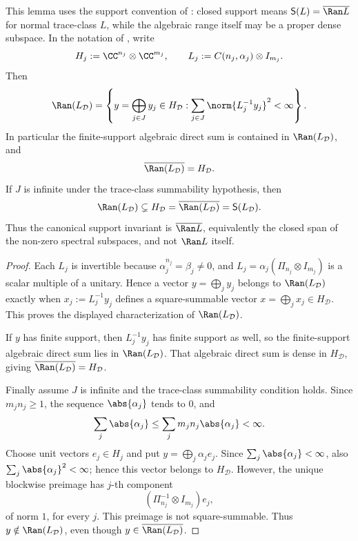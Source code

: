 \begin{lemma}
  \label{lem:cyclic-sum-range-closure}
  This lemma uses the support convention of
  : closed support means
  \(\mathsf S(L)=\overline{\Ran L}\) for normal trace-class \(L\), while
  the algebraic range itself may be a proper dense subspace.
  In the notation of , write
  \[
    H_j:=\CC^{n_j}\otimes\CC^{m_j},
    \qquad
    L_j:=C(n_j,\alpha_j)\otimes I_{m_j}.
  \]
  Then
  \[
    \Ran(L_{\mathcal D})
    =
    \left\{
      y=\bigoplus_{j\in J}y_j\in H_{\mathcal D}:
      \sum_{j\in J}\norm{L_j^{-1}y_j}^{2}<\infty
    \right\}.
  \]
  In particular the finite-support algebraic direct sum is contained in
  \(\Ran(L_{\mathcal D})\), and
  \[
    \overline{\Ran(L_{\mathcal D})}=H_{\mathcal D}.
  \]
  If \(J\) is infinite under the trace-class summability hypothesis, then
  \[
    \Ran(L_{\mathcal D})
    \subsetneq H_{\mathcal D}
    =\overline{\Ran(L_{\mathcal D})}
    =\mathsf S(L_{\mathcal D}).
  \]
  Thus the canonical support invariant is \(\overline{\Ran L}\),
  equivalently the closed span of the non-zero spectral subspaces, and not
  \(\Ran L\) itself.
\end{lemma}

\begin{proof}
  Each \(L_j\) is invertible because \(\alpha_j^{n_j}=\beta_j\ne0\), and
  \(L_j=\alpha_j(\Pi_{n_j}\otimes I_{m_j})\) is a scalar multiple of a
  unitary. Hence a vector \(y=\bigoplus_j y_j\) belongs to
  \(\Ran(L_{\mathcal D})\) exactly when
  \(x_j:=L_j^{-1}y_j\) defines a square-summable vector
  \(x=\bigoplus_jx_j\in H_{\mathcal D}\). This proves the displayed
  characterization of \(\Ran(L_{\mathcal D})\).

  If \(y\) has finite support, then \(L_j^{-1}y_j\) has finite support as
  well, so the finite-support algebraic direct sum lies in \(\Ran(L_{\mathcal D})\). That
  algebraic direct sum is dense in \(H_{\mathcal D}\), giving
  \(\overline{\Ran(L_{\mathcal D})}=H_{\mathcal D}\).

  Finally assume \(J\) is infinite and the trace-class summability condition
  holds. Since \(m_jn_j\ge1\), the sequence \(\abs{\alpha_j}\) tends to
  \(0\), and
  \[
    \sum_j\abs{\alpha_j}
    \le\sum_jm_jn_j\abs{\alpha_j}<\infty .
  \]
  Choose unit vectors \(e_j\in H_j\) and put
  \(y=\bigoplus_j\alpha_j e_j\). Since
  \(\sum_j\abs{\alpha_j}<\infty\), also
  \(\sum_j\abs{\alpha_j}^2<\infty\); hence this vector belongs to
  \(H_{\mathcal D}\). However, the
  unique blockwise preimage has \(j\)-th component
  \[
    (\Pi_{n_j}^{-1}\otimes I_{m_j})e_j,
  \]
  of norm \(1\), for every \(j\).
  This preimage is not square-summable. Thus \(y\notin
  \Ran(L_{\mathcal D})\), even though \(y\in
  \overline{\Ran(L_{\mathcal D})}\).
\end{proof}


